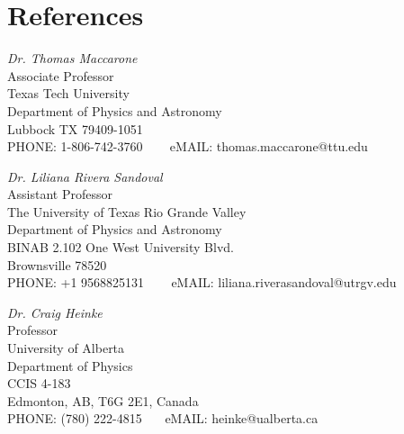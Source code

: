 \documentclass[letterpaper,10pt]{article}
\begin{document}
\pagebreak


\section*{References }  


   \begin{tabbing}
 \emph{Dr. Thomas Maccarone}\\
Associate Professor\\
Texas Tech University \\
Department of Physics and Astronomy \\
Lubbock TX 79409-1051 \\
PHONE:  1-806-742-3760 \,\,\,\,\,\,\,\,\, eMAIL: 
thomas.maccarone@ttu.edu
\end{tabbing}




   \begin{tabbing}
 \emph{Dr. Liliana Rivera Sandoval}\\
Assistant Professor \\
The University of Texas Rio Grande Valley \\
Department of Physics and Astronomy \\
BINAB 2.102 One West University Blvd. \\
Brownsville 78520 \\
PHONE:  +1 9568825131 \,\,\,\,\,\,\,\,\, eMAIL: 
liliana.riverasandoval@utrgv.edu
\end{tabbing}

   \begin{tabbing}
 \emph{Dr. Craig Heinke}\\
Professor \\
University of Alberta \\
Department of Physics \\
 CCIS 4-183 \\
 Edmonton, AB, T6G 2E1, Canada\\
PHONE:  (780) 222-4815\,\,\,\,\,\,\,\,\, eMAIL: 
 heinke@ualberta.ca
\end{tabbing}
\end{document}
